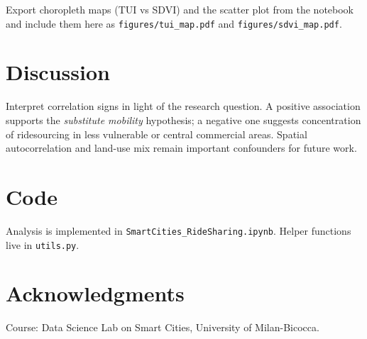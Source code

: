 \documentclass[9pt,a4paper,twocolumn,twoside]{rho-class/rho}
\begin{document}
    \begin{note}
        Export choropleth maps (TUI vs SDVI) and the scatter plot from the notebook and include them here as \texttt{figures/tui\_map.pdf} and \texttt{figures/sdvi\_map.pdf}.
    \end{note}

\section{Discussion}

    Interpret correlation signs in light of the research question. A positive association supports the \textit{substitute mobility} hypothesis; a negative one suggests concentration of ridesourcing in less vulnerable or central commercial areas. Spatial autocorrelation and land-use mix remain important confounders for future work.

\section{Code}

    Analysis is implemented in \texttt{SmartCities\_RideSharing.ipynb}. Helper functions live in \texttt{utils.py}.

    \begin{code}
        
        \label{lst:utils}
        \caption{Example Python utility (template). Replace with exported notebook snippets.}
    \end{code}

\section*{Acknowledgments}

    Course: Data Science Lab on Smart Cities, University of Milan-Bicocca.

\printbibliography
\end{document}
